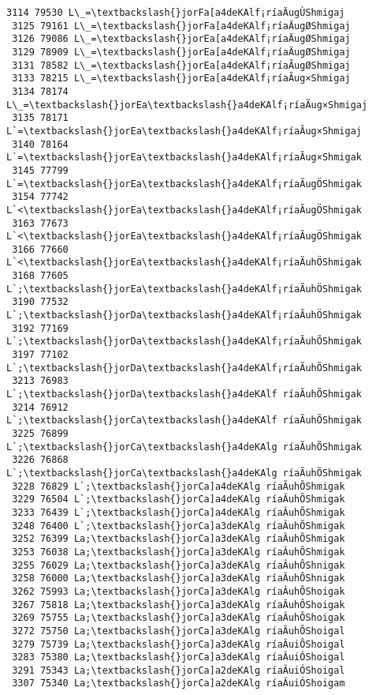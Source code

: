 \documentclass[11pt]{article}
\begin{document}
\begin{Verbatim}[commandchars=\\\{\}]
 3114 79530 L\_=\textbackslash{}jorFa[a4deKAlf¡ríaÄugÙShmigaj
 3125 79161 L\_=\textbackslash{}jorFa[a4deKAlf¡ríaÄugØShmigaj
 3126 79086 L\_=\textbackslash{}jorEa[a4deKAlf¡ríaÄugØShmigaj
 3129 78909 L\_=\textbackslash{}jorEa[a4deKAlf¡ríaÄugØShmigaj
 3131 78582 L\_=\textbackslash{}jorEa[a4deKAlf¡ríaÃugØShmigaj
 3133 78215 L\_=\textbackslash{}jorEa[a4deKAlf¡ríaÃug×Shmigaj
 3134 78174 L\_=\textbackslash{}jorEa\textbackslash{}a4deKAlf¡ríaÃug×Shmigaj
 3135 78171 L`=\textbackslash{}jorEa\textbackslash{}a4deKAlf¡ríaÃug×Shmigaj
 3140 78164 L`=\textbackslash{}jorEa\textbackslash{}a4deKAlf¡ríaÃug×Shmigak
 3145 77799 L`=\textbackslash{}jorEa\textbackslash{}a4deKAlf¡ríaÃugÖShmigak
 3154 77742 L`<\textbackslash{}jorEa\textbackslash{}a4deKAlf¡ríaÃugÖShmigak
 3163 77673 L`<\textbackslash{}jorEa\textbackslash{}a4deKAlf¡ríaÃugÖShmigak
 3166 77660 L`<\textbackslash{}jorEa\textbackslash{}a4deKAlf¡ríaÃuhÖShmigak
 3168 77605 L`;\textbackslash{}jorEa\textbackslash{}a4deKAlf¡ríaÃuhÖShmigak
 3190 77532 L`;\textbackslash{}jorDa\textbackslash{}a4deKAlf¡ríaÃuhÖShmigak
 3192 77169 L`;\textbackslash{}jorDa\textbackslash{}a4deKAlf¡ríaÃuhÕShmigak
 3197 77102 L`;\textbackslash{}jorDa\textbackslash{}a4deKAlf¡ríaÃuhÕShmigak
 3213 76983 L`;\textbackslash{}jorDa\textbackslash{}a4deKAlf ríaÃuhÕShmigak
 3214 76912 L`;\textbackslash{}jorCa\textbackslash{}a4deKAlf ríaÃuhÕShmigak
 3225 76899 L`;\textbackslash{}jorCa\textbackslash{}a4deKAlg ríaÃuhÕShmigak
 3226 76868 L`;\textbackslash{}jorCa\textbackslash{}a4deKAlg ríaÃuhÕShmigak
 3228 76829 L`;\textbackslash{}jorCa]a4deKAlg ríaÃuhÕShmigak
 3229 76504 L`;\textbackslash{}jorCa]a4deKAlg ríaÂuhÕShmigak
 3233 76439 L`;\textbackslash{}jorCa]a4deKAlg ríaÂuhÕShmigak
 3248 76400 L`;\textbackslash{}jorCa]a3deKAlg ríaÂuhÕShmigak
 3252 76399 La;\textbackslash{}jorCa]a3deKAlg ríaÂuhÕShmigak
 3253 76038 La;\textbackslash{}jorCa]a3deKAlg ríaÂuhÔShmigak
 3255 76029 La;\textbackslash{}jorCa]a3deKAlg ríaÂuhÔShnigak
 3258 76000 La;\textbackslash{}jorCa]a3deKAlg ríaÂuhÔShnigak
 3262 75993 La;\textbackslash{}jorCa]a3deKAlg ríaÂuhÔShoigak
 3267 75818 La;\textbackslash{}jorCa]a3deKAlg ríaÂuhÔShoigak
 3269 75755 La;\textbackslash{}jorCa]a3deKAlg ríaÂuhÔShoigak
 3272 75750 La;\textbackslash{}jorCa]a3deKAlg ríaÂuhÔShoigal
 3279 75739 La;\textbackslash{}jorCa]a3deKAlg ríaÂuiÔShoigal
 3283 75380 La;\textbackslash{}jorCa]a3deKAlg ríaÂuiÓShoigal
 3291 75343 La;\textbackslash{}jorCa]a2deKAlg ríaÂuiÓShoigal
 3307 75340 La;\textbackslash{}jorCa]a2deKAlg ríaÂuiÓShoigam

\end{Verbatim}
\end{document}

